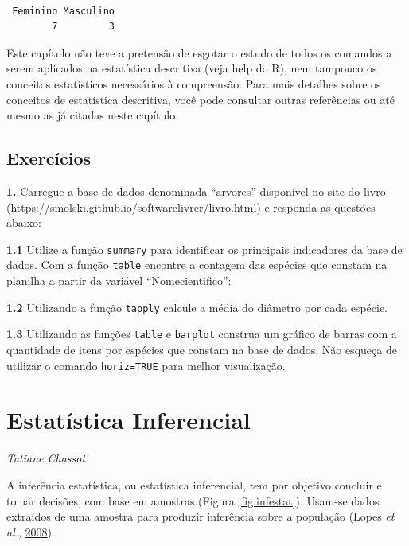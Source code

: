 \documentclass[12pt,brazil,oneside]{book}
\begin{document}
\begin{verbatim}

 Feminino Masculino 
        7         3 
\end{verbatim}

Este capítulo não teve a pretensão de esgotar o estudo de todos os comandos a serem aplicados na estatística descritiva (veja help do R), nem tampouco os conceitos estatísticos necessários à compreensão. Para mais detalhes sobre os conceitos de estatística descritiva, você pode consultar outras referências ou até mesmo as já citadas neste capítulo.

\hypertarget{exercicios-1}{%
\section{Exercícios}\label{exercicios-1}}

\textbf{1.} Carregue a base de dados denominada ``arvores'' disponível no site do livro (\url{https://smolski.github.io/softwarelivrer/livro.html}) e responda as questões abaixo:

\textbf{1.1} Utilize a função \texttt{summary} para identificar os principais indicadores da base de dados. Com a função \texttt{table} encontre a contagem das espécies que constam na planilha a partir da variável ``Nomecientifico'':

\textbf{1.2} Utilizando a função \texttt{tapply} calcule a média do diâmetro por cada espécie.

\textbf{1.3} Utilizando as funções \texttt{table} e \texttt{barplot} construa um gráfico de barras com a quantidade de itens por espécies que constam na base de dados. Não esqueça de utilizar o comando \texttt{horiz=TRUE} para melhor visualização.

\hypertarget{inf}{%
\chapter{Estatística Inferencial}\label{inf}}

\emph{Tatiane Chassot}

\begin{flushright}
\emph{}
\end{flushright}

A inferência estatística, ou estatística inferencial, tem por objetivo concluir e tomar decisões, com base em amostras (Figura \ref{fig:infestat}). Usam-se dados extraídos de uma amostra para produzir inferência sobre a população (Lopes \emph{et al.}, \protect\hyperlink{ref-lopes2008}{2008}).
\end{document}
